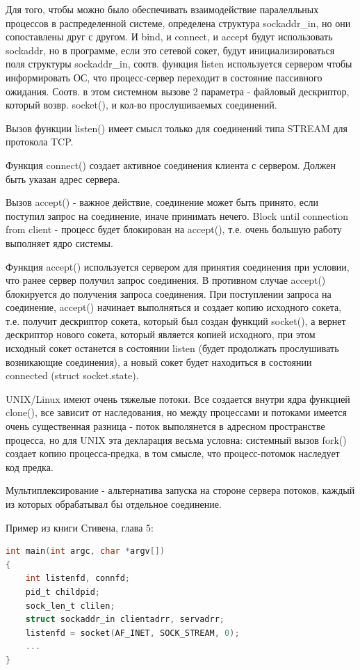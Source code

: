 \documentclass[12pt,a4paper]{scrreprt}
\begin{document}
Для того, чтобы можно было обеспечивать взаимодействие паралелльных процессов в распределенной системе, определена структура sockaddr\_in, но они сопоставлены друг с другом. И bind, и connect, и accept будут использовать sockaddr, но в программе, если это сетевой сокет, будут инициализироваться поля структуры sockaddr\_in, соотв. функция listen используется сервером чтобы информировать ОС, что процесс-сервер переходит в состояние пассивного ожидания. Соотв. в этом системном вызове 2 параметра - файловый дескриптор, который возвр. socket(), и кол-во прослушиваемых соединений.

Вызов функции listen() имеет смысл только для соединений типа STREAM для протокола TCP.

Функция connect() создает активное соединения клиента с сервером. Должен быть указан адрес сервера.

Вызов accept() - важное действие, соединение может быть принято, если поступил запрос на соединение, иначе принимать нечего. Block until connection from client - процесс будет блокирован на accept(), т.е. очень большую работу выполняет ядро системы. 

Функция accept() используется сервером для принятия соединения при условии, что ранее сервер получил запрос соединения. В противном случае accept() блокируется до получения запроса соединения. При поступлении запроса на соединение, accept() начинает выполняться и создает копию исходного сокета, т.е. получит дескриптор сокета, который был создан функций socket(), а вернет дескриптор нового сокета, который является копией исходного, при этом исходный сокет останется в состоянии listen (будет продолжать прослушивать возникающие соединения), а новый сокет будет находиться в состоянии connected (struct socket.state). 

UNIX/Linux имеют очень тяжелые потоки. Все создается внутри ядра функцией clone(), все зависит от наследования, но между процессами и потоками имеется очень существенная разница - поток выполянется в адресном пространстве процесса, но для UNIX эта декларация весьма условна: системный вызов fork() создает копию процесса-предка, в том смысле, что процесс-потомок наследует код предка.

Мультиплексирование - альтернатива запуска на стороне сервера потоков, каждый из которых обрабатывал бы отдельное соединение.

Пример из книги Стивена, глава 5:

\begin{lstlisting}[language=C]
int main(int argc, char *argv[])
{
	int listenfd, connfd;
	pid_t childpid;
	sock_len_t clilen;
	struct sockaddr_in clientadrr, servadrr;
	listenfd = socket(AF_INET, SOCK_STREAM, 0);
	...
}
\end{lstlisting}
\end{document}
